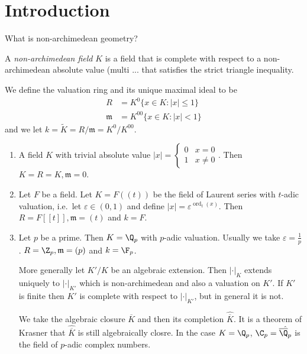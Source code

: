 \documentclass[a4paper]{article}
\begin{document}


\tableofcontents

\section{Introduction}

What is non-archimedean geometry?

\begin{definition}
  A \emph{non-archimedean field} \(K\) is a field that is complete with respect to a non-archimedean absolute value (multi ... that satisfies the strict triangle inequality.
\end{definition}

\begin{notation}
  We define the valuation ring and its unique maximal ideal to be
  \begin{align*}
    R &= K^0 \{x \in K: |x| \leq 1\} \\
    \mathfrak m &= K^{00} \{x \in K: |x| < 1\}
  \end{align*}
  and we let \(k = \tilde K = R/\mathfrak m = K^0/K^{00}\).
\end{notation}

\begin{eg}\leavevmode
  \begin{enumerate}
  \item A field \(K\) with trivial absolute value \(|x| =
    \begin{cases}
      0 & x = 0 \\
      1 & x \ne 0
    \end{cases}
    \). Then \(K = R = K, \mathfrak m = 0\).
  \item Let \(F\) be a field. Let \(K = F((t))\) be the field of Laurent series with \(t\)-adic valuation, i.e.\ let \(\varepsilon \in (0, 1)\) and define \(|x| = \varepsilon^{\operatorname{ord}_t(x)}\). Then \(R = F[[t]], \mathfrak m = (t)\) and \(k = F\).
  \item Let \(p\) be a prime. Then \(K = \Q_p\) with \(p\)-adic valuation. Usually we take \(\varepsilon = \frac{1}{p}\). \(R = \Z_p, \mathfrak m = (p)\) and \(k = \F_p\).

    More generally let \(K'/K\) be an algebraic extension. Then \(|\cdot|_K\) extends uniquely to \(|\cdot|_{K'}\) which is non-archimedean and also a valuation on \(K'\). If \(K'\) is finite then \(K'\) is complete with respect to \(|\cdot|_{K'}\), but in general it is not.

    We take the algebraic closure \(\overline K\) and then its completion \(\hat{\overline K}\). It is a theorem of Krasner that \(\hat{\overline K}\) is still algebraically closre. In the case \(K = \Q_p\), \(\C_p = \hat{\overline \Q_p}\) is the field of \(p\)-adic complex numbers.
  \end{enumerate}
\end{eg}
\end{document}
